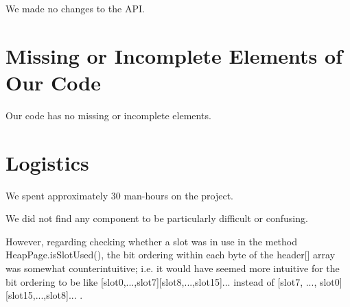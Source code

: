 \documentclass[paper=a4, fontsize=11pt]{scrartcl} %
\numberwithin{equation}{section} %
\numberwithin{figure}{section} %
\numberwithin{table}{section} %
\begin{document}
We made no changes to the API.




\section{Missing or Incomplete Elements of Our Code}

Our code has no missing or incomplete elements.




\section{Logistics}

We spent approximately 30 man-hours on the project.

We did not find any component to be particularly difficult or confusing.

However, regarding checking whether a slot was in use in the method HeapPage.isSlotUsed(), the bit ordering within each byte of the header[] array was somewhat counterintuitive; i.e. it would have seemed more intuitive for the bit ordering to be like [slot0,...,slot7][slot8,...,slot15]... instead of  [slot7, ..., slot0][slot15,...,slot8]... .
\end{document}
